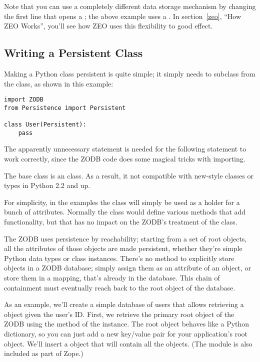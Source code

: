 Note that you can use a completely different data storage mechanism by
changing the first line that opens a ; the above example uses a
.  In section~\ref{zeo}, ``How ZEO Works'',
you'll see how ZEO uses this flexibility to good effect.

\subsection{Writing a Persistent Class}

Making a Python class persistent is quite simple; it simply needs to
subclass from the  class, as shown in this example:

\begin{verbatim}
import ZODB
from Persistence import Persistent

class User(Persistent):
    pass
\end{verbatim}

The apparently unnecessary  statement is
needed for the following  statement to work
correctly, since the ZODB code does some magical tricks with
importing.

The  base class is an 
class.  As a result, it not compatible with new-style classes or types
in Python 2.2 and up.

For simplicity, in the examples the  class will
simply be used as a holder for a bunch of attributes.  Normally the
class would define various methods that add functionality, but that
has no impact on the ZODB's treatment of the class.

The ZODB uses persistence by reachability; starting from a set of root
objects, all the attributes of those objects are made persistent,
whether they're simple Python data types or class instances.  There's
no method to explicitly store objects in a ZODB database; simply
assign them as an attribute of an object, or store them in a mapping,
that's already in the database.  This chain of containment must
eventually reach back to the root object of the database.

As an example, we'll create a simple database of users that allows
retrieving a  object given the user's ID.  First, we
retrieve the primary root object of the ZODB using the 
method of the  instance.  The root object behaves
like a Python dictionary, so you can just add a new key/value pair for
your application's root object.  We'll insert a  object
that will contain all the  objects.  (The
 module is also included as part of Zope.)

